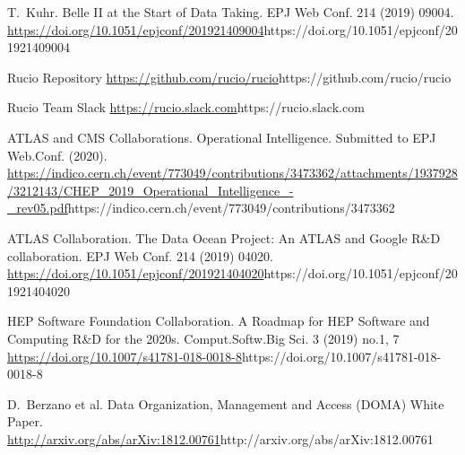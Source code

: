 \documentclass[11pt]{article}
\begin{document}
\begin{thebibliography}{99}
\begin{small}
T.~Kuhr.
\newblock Belle II at the Start of Data Taking.
\newblock EPJ Web Conf. 214 (2019) 09004.
\newblock \url{https://doi.org/10.1051/epjconf/201921409004}{https://doi.org/10.1051/epjconf/201921409004}

Rucio Repository
\newblock \url{https://github.com/rucio/rucio}{https://github.com/rucio/rucio}

Rucio Team Slack
\newblock \url{https://rucio.slack.com}{https://rucio.slack.com}

ATLAS and CMS Collaborations.
\newblock Operational Intelligence.
\newblock Submitted to EPJ Web.Conf. (2020).
\newblock \url{https://indico.cern.ch/event/773049/contributions/3473362/attachments/1937928/3212143/CHEP_2019_Operational_Intelligence_-_rev05.pdf}{https://indico.cern.ch/event/773049/contributions/3473362}

ATLAS Collaboration.
\newblock The Data Ocean Project: An ATLAS and Google R\&D collaboration.
\newblock EPJ Web Conf. 214 (2019) 04020.
\newblock \url{https://doi.org/10.1051/epjconf/201921404020}{https://doi.org/10.1051/epjconf/201921404020}

HEP Software Foundation Collaboration.
\newblock A Roadmap for HEP Software and Computing R\&D for the 2020s.
\newblock Comput.Softw.Big Sci. 3 (2019) no.1, 7
\newblock \url{https://doi.org/10.1007/s41781-018-0018-8}{https://doi.org/10.1007/s41781-018-0018-8}

D.~Berzano et al.
\newblock Data Organization, Management and Access (DOMA)
\newblock White Paper.
\newblock \url{http://arxiv.org/abs/arXiv:1812.00761}{http://arxiv.org/abs/arXiv:1812.00761}

\end{small}
\end{thebibliography} 
\end{document}
